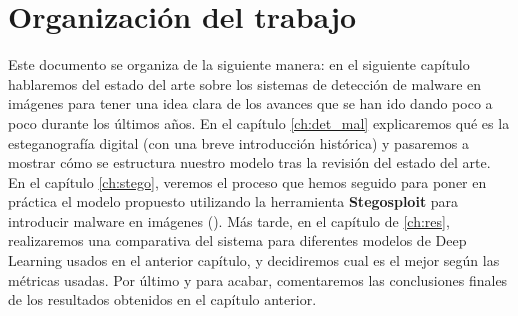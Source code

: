 \section{Organización del trabajo}

Este documento se organiza de la siguiente manera: en el siguiente capítulo hablaremos del estado del arte sobre los sistemas de detección de malware en imágenes para tener una idea clara de los avances que se han ido dando poco a poco durante los últimos años. En el capítulo \ref{ch:det_mal} explicaremos qué es la esteganografía digital (con una breve introducción histórica) y pasaremos a mostrar cómo se estructura nuestro modelo tras la revisión del estado del arte. En el capítulo \ref{ch:stego}, veremos el proceso que hemos seguido para poner en práctica el modelo propuesto utilizando la herramienta \textbf{Stegosploit} para introducir malware en imágenes (\cite{stegosploit}). Más tarde, en el capítulo de \ref{ch:res}, realizaremos una comparativa del sistema para diferentes modelos de Deep Learning usados en el anterior capítulo, y decidiremos cual es el mejor según las métricas usadas. Por último y para acabar, comentaremos las conclusiones finales de los resultados obtenidos en el capítulo anterior. %